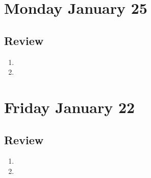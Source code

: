 

\section*{Monday January 25}




\newpage





% 
% 

\newpage
\subsection*{Review}
\begin{enumerate}
\item 
\item 
\end{enumerate}

\newpage

\section*{Friday January 22}



\newpage

\newpage

\subsection*{Review}
\begin{enumerate}
\item 
\item 
\end{enumerate}


